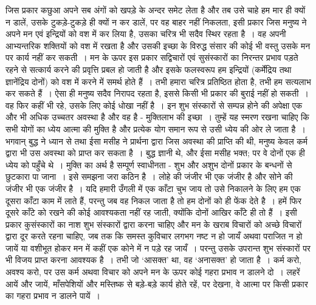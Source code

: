 जिस प्रकार कछुआ अपने सब अंगों को खपड़े के अन्दर समेट लेता है और तब उसे चाहे हम मार ही क्यों न डालें, उसके टुकड़े-टुकड़े ही क्यों न कर डालें, पर वह बाहर नहीं निकलता, इसी प्रकार जिस मनुष्य ने अपने मन एवं इन्द्रियों को वश में कर लिया है, उसका चरित्र भी सदैव स्थिर रहता है~। वह अपनी आभ्यन्तरिक शक्तियों को वश में रखता है और उसकी इच्छा के विरुद्ध संसार की कोई भी वस्तु उसके मन पर कार्य नहीं कर सकती~। मन के ऊपर इस प्रकार सद्विचारों एवं सुसंस्कारों का निरन्तर प्रभाव पड़ते रहने से सत्कार्य करने की प्रवृत्ति प्रबल हो जाती है और इसके फलस्वरूप हम इन्द्रियों (कर्मेंद्रिय तथा ज्ञानेंद्रिय दोनों) को वश में करने में समर्थ होते हैं~। तभी हमारा चरित्र प्रतिष्ठित होता है, तभी हम सत्यलाभ कर सकते हैं~। ऐसा ही मनुष्य सदैव निरापद रहता है, इससे किसी भी प्रकार की बुराई नहीं हो सकती~। वह फिर कहीं भी रहे, उसके लिए कोई धोखा नहीं है~। इन शुभ संस्कारों से सम्पन्न होने की अपेक्षा एक और भी अधिक उच्चतर अवस्था है और वह है - मुक्तिलाभ की इच्छा~। तुम्हें यह स्मरण रखना चाहिए कि सभी योगों का ध्येय आत्मा की मुक्ति है और प्रत्येक योग समान रूप से उसी ध्येय की ओर ले जाता है~। भगवान् बुद्ध ने ध्यान से तथा ईसा मसीह ने प्रार्थना द्वारा जिस अवस्था की प्राप्ति की थी, मनुष्य केवल कर्म द्वारा भी उस अवस्था को प्राप्त कर सकता है~। बुद्ध ज्ञानी थे, और ईसा मसीह भक्त; पर वे दोनों एक ही ध्येय को पहुँचे थे~। मुक्ति का अर्थ है सम्पूर्ण स्वाधीनता - शुभ और अशुभ दोनों प्रकार के बन्धनों से छुटकारा पा जाना~। इसे समझना जरा कठिन है~। लोहे की जंजीर भी एक जंजीर है और सोने की जंजीर भी एक जंजीर है~। यदि हमारी उँगली में एक काँटा चुभ जाय तो उसे निकालने के लिए हम एक दूसरा काँटा काम में लाते हैं, परन्तु जब वह निकल जाता है तो हम दोनों को ही फेंक देते है~। हमें फिर दूसरे काँटे को रखने की कोई आवश्यकता नहीं रह जाती, क्योंकि दोनों आखिर काँटे ही तो हैं~। इसी प्रकार कुसंस्कारों का नाश शुभ संस्कारों द्वारा करना चाहिए और मन के खराब विचारों को अच्छे विचारों द्वारा दूर करते रहना चाहिए, जब तक कि समस्त कुविचार लगभग नष्ट न हो जायँ अथवा पराजित न हो जायें या वशीभूत होकर मन में कहीं एक कोने में न पड़े रह जायँ~। परन्तु उसके उपरान्त शुभ संस्कारों पर भी विजय प्राप्त करना आवश्यक है~। तभी जो ‘आसक्त’ था, वह ‘अनासक्त’ हो जाता है~। कर्म करो, अवश्य करो, पर उस कर्म अथवा विचार को अपने मन के ऊपर कोई गहरा प्रभाव न डालने दो~। लहरें आयें और जायें, माँसपेशियों और मस्तिष्क से बड़े-बड़े कार्य होते रहें, पर देखना, वे आत्मा पर किसी प्रकार का गहरा प्रभाव न डालने पायें~।

